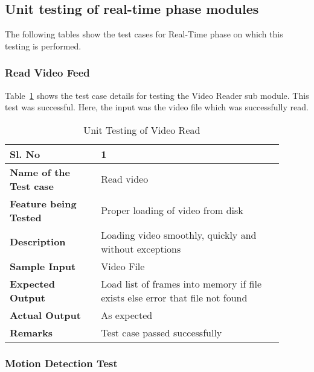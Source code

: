    \subsection{Unit testing of real-time phase modules}
    The following tables show the test cases for Real-Time phase on which this
    testing is performed.

        \subsubsection{Read Video Feed}

        Table~\ref{table:unit-video-read} shows the test case details for
        testing the Video Reader sub module. This test was successful. Here,
        the input was the video file which was successfully read.

        \FloatBarrier
        \begin{table}[H]
            \caption{Unit Testing of Video Read}
            \begin{tabular}{|p{0.3\linewidth}|p{0.6\linewidth}|}
                \hline
                \textbf{Sl. No }              &\textbf{ 1}\\
                \hline
                \textbf{Name of the Test case}& Read video \\
                \hline
                \textbf{Feature being Tested}  & Proper loading of video from
                disk \\
                \hline
                \textbf{Description}           &  Loading video smoothly,
                quickly and without exceptions \\
                \hline
                \textbf{Sample Input}          & Video File \\
                \hline
                \textbf{Expected Output}       & Load list of frames into
                memory if file exists else error that file not found \\
                \hline
                \textbf{Actual Output}         & As expected \\
                \hline
                \textbf{Remarks }              & Test case passed
                successfully \\
                \hline
            \end{tabular}
            \label{table:unit-video-read}
        \end{table}


        \subsubsection{Motion Detection Test}

